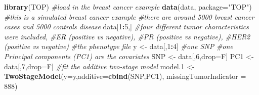 \documentclass[11pt,]{article}
\newenvironment{Shaded}{\begin{snugshade}}{\end{snugshade}}
\newcommand{\KeywordTok}[1]{\textcolor[rgb]{0.13,0.29,0.53}{\textbf{#1}}}
\newcommand{\DataTypeTok}[1]{\textcolor[rgb]{0.13,0.29,0.53}{#1}}
\newcommand{\DecValTok}[1]{\textcolor[rgb]{0.00,0.00,0.81}{#1}}
\newcommand{\StringTok}[1]{\textcolor[rgb]{0.31,0.60,0.02}{#1}}
\newcommand{\CommentTok}[1]{\textcolor[rgb]{0.56,0.35,0.01}{\textit{#1}}}
\newcommand{\OperatorTok}[1]{\textcolor[rgb]{0.81,0.36,0.00}{\textbf{#1}}}
\newcommand{\NormalTok}[1]{#1}
\begin{document}
\begin{Shaded}
\begin{Highlighting}[]
\KeywordTok{library}\NormalTok{(TOP)}
\CommentTok{#load in the breast cancer example}
\KeywordTok{data}\NormalTok{(data, }\DataTypeTok{package=}\StringTok{"TOP"}\NormalTok{)}
\CommentTok{#this is a simulated breast cancer example}
\CommentTok{#there are around 5000 breast cancer cases and 5000 controls disease}
\NormalTok{data[}\DecValTok{1}\OperatorTok{:}\DecValTok{5}\NormalTok{,]}
\CommentTok{#four different tumor characteristics were included, }
\CommentTok{#ER (positive vs negative), }
\CommentTok{#PR (positive vs negative),}
\CommentTok{#HER2 (positive vs negative)}
\CommentTok{#the phenotype file}
\NormalTok{y <-}\StringTok{ }\NormalTok{data[,}\DecValTok{1}\OperatorTok{:}\DecValTok{4}\NormalTok{]}
\CommentTok{#one SNP}
\CommentTok{#one Principal components (PC1) are the covariates}
\NormalTok{SNP <-}\StringTok{ }\NormalTok{data[,}\DecValTok{6}\NormalTok{,drop=F]}
\NormalTok{PC1 <-}\StringTok{ }\NormalTok{data[,}\DecValTok{7}\NormalTok{,drop=F]}
\CommentTok{#fit the additive two-stage model}
\NormalTok{model.}\DecValTok{1}\NormalTok{ <-}\StringTok{ }\KeywordTok{TwoStageModel}\NormalTok{(}\DataTypeTok{y=}\NormalTok{y,}\DataTypeTok{additive=}\KeywordTok{cbind}\NormalTok{(SNP,PC1),}
                         \DataTypeTok{missingTumorIndicator =} \DecValTok{888}\NormalTok{)}
\end{Highlighting}
\end{Shaded}

\begin{Shaded}
\end{Shaded}
\end{document}
